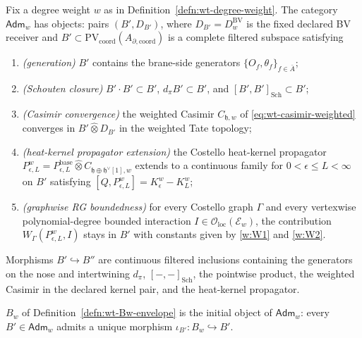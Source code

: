 \begin{defn}\label{defn:wt-Adm-category}
  Fix a degree weight $w$ as in Definition~\ref{defn:wt-degree-weight}.
  The category $\mathsf{Adm}_w$ has objects: pairs
  \((B',D_{B'})\), where
  \(D_{B'}=D^{\mathrm{BV}}_w\) is the fixed declared BV receiver and
  \(B'\subset\mathrm{PV}_{\mathrm{coord}}(A_{\partial,\mathrm{coord}})\)
  is a complete filtered subspace satisfying
  \begin{enumerate}[label=(A\arabic*)]
    \item\label{adm:gen} \emph{(generation)} $B'$ contains the
      brane-side generators $\{O_f,\theta_f\}_{f\in\bar A}$;
    \item\label{adm:schouten} \emph{(Schouten closure)}
      $B'\cdot B'\subset B'$, $d_\pi B'\subset B'$, and
      $[B',B']_{\mathrm{Sch}}\subset B'$;
    \item\label{adm:casimir} \emph{(Casimir convergence)} the weighted
      Casimir $C_{\mathfrak h,w}$ of
      \eqref{eq:wt-casimir-weighted} converges in
      \(B'\widehat\otimes D_{B'}\) in the weighted Tate topology;
    \item\label{adm:propagator} \emph{(heat-kernel propagator
      extension)} the Costello heat-kernel propagator
      $P^w_{\epsilon,L}=P^{\mathrm{base}}_{\epsilon,L}\widehat\otimes
      C_{\mathfrak h\oplus\mathfrak h^\vee[1],w}$ extends to a continuous
      family for $0<\epsilon\le L<\infty$ on $B'$ satisfying
      $[Q,P^w_{\epsilon,L}]=K^w_\epsilon-K^w_L$;
    \item\label{adm:rg} \emph{(graphwise RG boundedness)} for every
      Costello graph $\Gamma$ and every vertexwise polynomial-degree
      bounded interaction
      $I\in\mathcal O_{\mathrm{loc}}(\mathcal E_w)$, the contribution
      $W_\Gamma(P^w_{\epsilon,L},I)$ stays in $B'$ with constants
      given by \ref{w:W1} and \ref{w:W2}.
  \end{enumerate}
  Morphisms $B'\hookrightarrow B''$ are continuous filtered inclusions
  containing the generators on the nose and intertwining $d_\pi$,
  $[-,-]_{\mathrm{Sch}}$, the pointwise product, the weighted Casimir in
  the declared kernel pair, and the heat-kernel propagator.
\end{defn}

\begin{cor}\label{cor:wt-Bw-initial}
  $B_w$ of Definition~\ref{defn:wt-Bw-envelope} is the initial object
  of $\mathsf{Adm}_w$: every $B'\in\mathsf{Adm}_w$ admits a unique
  morphism $\iota_{B'}\colon B_w\hookrightarrow B'$.
\end{cor}

